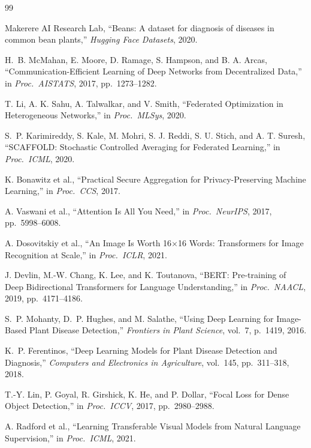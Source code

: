\documentclass[12pt, a4paper, oneside]{Thesis}
\begin{document}
\begin{thebibliography}{99}

Makerere AI Research Lab,
``Beans: A dataset for diagnosis of diseases in common bean plants,''
\textit{Hugging Face Datasets}, 2020.

H.~B. McMahan, E. Moore, D. Ramage, S. Hampson, and B. A. Arcas,
``Communication-Efficient Learning of Deep Networks from Decentralized Data,''
in \textit{Proc.\ AISTATS}, 2017, pp.\ 1273--1282.

T. Li, A. K. Sahu, A. Talwalkar, and V. Smith,
``Federated Optimization in Heterogeneous Networks,''
in \textit{Proc.\ MLSys}, 2020.

S.~P. Karimireddy, S. Kale, M. Mohri, S. J. Reddi, S. U. Stich, and A. T. Suresh,
``SCAFFOLD: Stochastic Controlled Averaging for Federated Learning,''
in \textit{Proc.\ ICML}, 2020.

K. Bonawitz et al.,
``Practical Secure Aggregation for Privacy-Preserving Machine Learning,''
in \textit{Proc.\ CCS}, 2017.

A. Vaswani et al.,
``Attention Is All You Need,''
in \textit{Proc.\ NeurIPS}, 2017, pp.\ 5998--6008.

A. Dosovitskiy et al.,
``An Image Is Worth 16$\times$16 Words: Transformers for Image Recognition at Scale,''
in \textit{Proc.\ ICLR}, 2021.

J. Devlin, M.-W. Chang, K. Lee, and K. Toutanova,
``BERT: Pre-training of Deep Bidirectional Transformers for Language Understanding,''
in \textit{Proc.\ NAACL}, 2019, pp.\ 4171--4186.

S.~P. Mohanty, D.~P. Hughes, and M. Salathe,
``Using Deep Learning for Image-Based Plant Disease Detection,''
\textit{Frontiers in Plant Science}, vol.\ 7, p.\ 1419, 2016.

K.~P. Ferentinos,
``Deep Learning Models for Plant Disease Detection and Diagnosis,''
\textit{Computers and Electronics in Agriculture}, vol.\ 145, pp.\ 311--318, 2018.

T.-Y. Lin, P. Goyal, R. Girshick, K. He, and P. Dollar,
``Focal Loss for Dense Object Detection,''
in \textit{Proc.\ ICCV}, 2017, pp.\ 2980--2988.

A. Radford et al.,
``Learning Transferable Visual Models from Natural Language Supervision,''
in \textit{Proc.\ ICML}, 2021.


\end{thebibliography}
\end{document}
